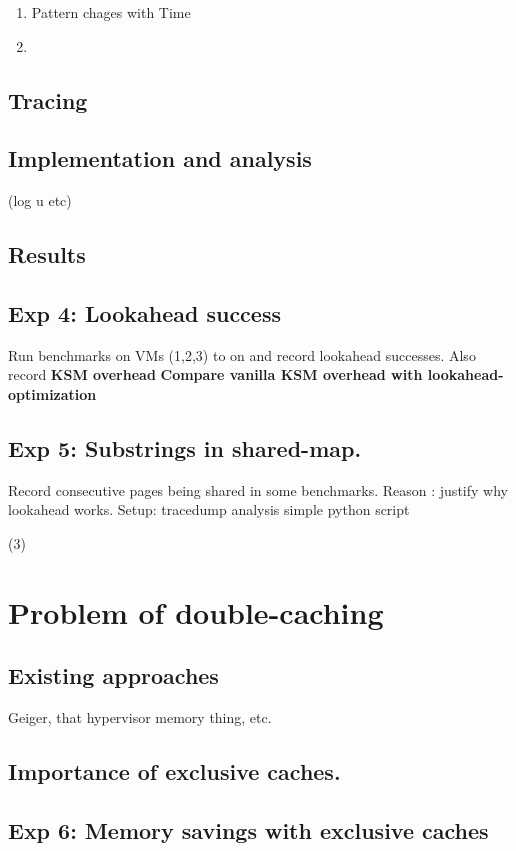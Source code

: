 \documentclass[11pt]{article}
\begin{document}
\begin{enumerate}
\item Pattern chages with Time
\item 
\end{enumerate}
\subsection{Tracing}
\label{sec-7_2}
\subsection{Implementation and analysis}
\label{sec-7_3}

   (log u etc)
\subsection{Results}
\label{sec-7_4}
\subsection{Exp 4: Lookahead success}
\label{sec-7_5}

Run benchmarks on VMs (1,2,3) to on and record lookahead successes. Also record \textbf{KSM overhead}
\textbf{Compare vanilla KSM overhead with lookahead-optimization}
\subsection{Exp 5: Substrings in shared-map.}
\label{sec-7_6}

Record consecutive pages being shared in some benchmarks.
Reason : justify why lookahead works.
Setup: tracedump analysis simple python script 

   (3)
\section{Problem of double-caching}
\label{sec-8}
\subsection{Existing approaches}
\label{sec-8_1}

Geiger, that hypervisor memory thing, etc.
\subsection{Importance of exclusive caches.}
\label{sec-8_2}
\subsection{Exp 6: Memory savings with exclusive caches}
\label{sec-8_3}
\end{document}

